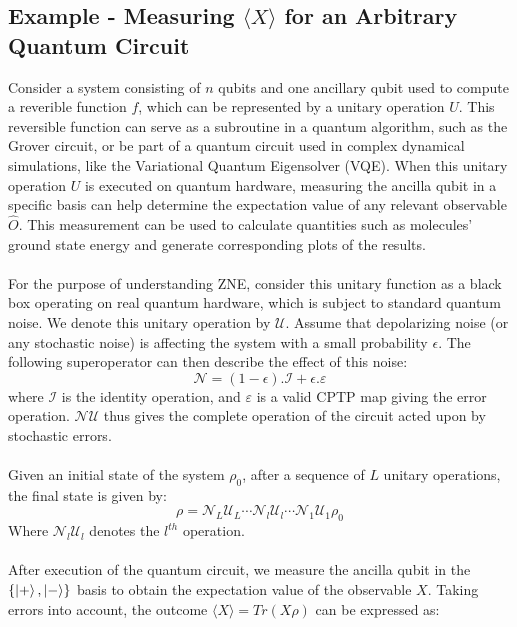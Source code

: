 \documentclass[12pt]{article}
\begin{document}
\subsection{Example - Measuring $\langle X \rangle$ for an Arbitrary Quantum Circuit}
Consider a system consisting of \( n \) qubits and one ancillary qubit used to compute a reverible function \( f \), which can be represented by a unitary operation $U$. This reversible function can serve as a subroutine in a quantum algorithm, such as the Grover circuit, or be part of a quantum circuit used in complex dynamical simulations, like the Variational Quantum Eigensolver (VQE). When this unitary operation \( U \) is executed on quantum hardware, measuring the ancilla qubit in a specific basis can help determine the expectation value of any relevant observable \( \hat{O} \). This measurement can be used to calculate quantities such as molecules' ground state energy and generate corresponding plots of the results. \\ \\
For the purpose of understanding ZNE, consider this unitary function as a black box operating on real quantum hardware, which is subject to standard quantum noise. We denote this unitary operation by \( \mathcal{U} \). Assume that depolarizing noise (or any stochastic noise) is affecting the system with a small probability \( \epsilon \). The following superoperator can then describe the effect of this noise:
\begin{equation}
    \mathcal{N} = (1-\epsilon).\mathcal{I} + \epsilon. \varepsilon
\end{equation}
where $\mathcal{I}$ is the identity operation, and $\varepsilon$ is a valid CPTP map giving the error operation. $\mathcal{N} \mathcal{U}$ thus gives the complete operation of the circuit acted upon by stochastic errors. \\ \\
Given an initial state of the system $\rho_0$, after a sequence of $L$ unitary operations, the final state is given by:
\begin{equation}
    \rho = \mathcal{N}_L \mathcal{U}_L \cdots \mathcal{N}_l \mathcal{U}_l \cdots \mathcal{N}_1 \mathcal{U}_1 \rho_0
\end{equation}
Where $\mathcal{N}_l \mathcal{U}_l$ denotes the $l^{th}$ operation. \\ \\
After execution of the quantum circuit, we measure the ancilla qubit in the $\{\left\vert{+}\right\rangle, \left\vert{-}\right\rangle\}$ basis to obtain the expectation value of the observable $X$. Taking errors into account, the outcome $\langle X \rangle = Tr(X \rho)$ can be expressed as:
\end{document}
